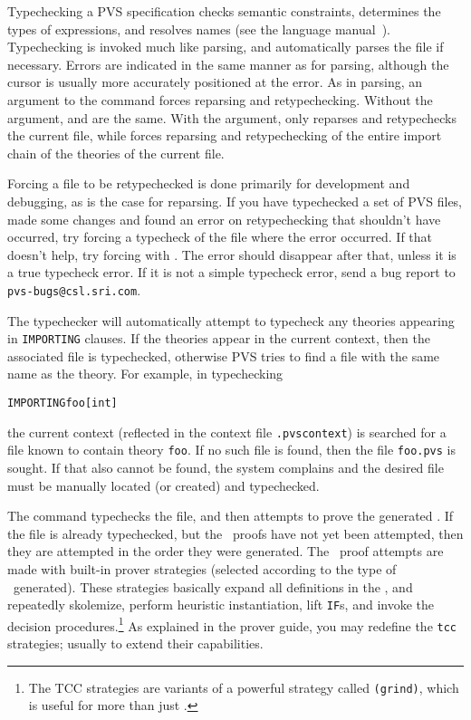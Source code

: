 Typechecking a PVS specification checks semantic constraints, determines
the types of expressions, and resolves names (see the language
manual~\cite{PVS:language}).  Typechecking is invoked
much like parsing, and automatically parses the file if necessary.  Errors
are indicated in the same manner as for parsing, although the cursor is
usually more accurately positioned at the error.  As in parsing, an
argument to the command forces reparsing and retypechecking.  Without the
argument,  and  are the same.
With the argument,  only reparses and retypechecks the
current file, while  forces reparsing and
retypechecking of the entire import chain of the theories of the current
file.

Forcing a file to be retypechecked is done primarily for development and
debugging, as is the case for reparsing.  If you have typechecked a set of
PVS files, made some changes and found an error on retypechecking that
shouldn't have occurred, try forcing a typecheck of the file where the
error occurred.  If that doesn't help, try forcing with
.  The error should disappear after that,
unless it is a true typecheck error.  If it is not a simple typecheck
error, send a bug report to \texttt{pvs-bugs@csl.sri.com}.

The typechecker will automatically attempt to typecheck any theories
appearing in \texttt{IMPORTING} clauses.  If the theories appear in the
current context, then the associated file is typechecked, otherwise
PVS tries to find a file with the same name as the theory.  For
example, in typechecking
\begin{alltt}
  IMPORTING foo[int]
\end{alltt}
the current context (reflected in the context file \texttt{.pvscontext}) is
searched for a file known to contain theory \texttt{foo}.  If no such file is
found, then the file \texttt{foo.pvs} is sought.  If that also cannot be
found, the system complains and the desired file must be manually
located (or created) and typechecked.

The  command typechecks the file, and then attempts
to prove the generated \tccs.  If the file is already typechecked, but the
\tcc\ proofs have not yet been attempted, then they are attempted in the
order they were generated.  The \tcc\ proof attempts are made with 
built-in prover strategies (selected according to the type of \tcc\
generated). These strategies basically expand all
definitions in the \tcc, and repeatedly skolemize, perform heuristic
instantiation, lift \texttt{IF}s, and invoke the decision
procedures.\footnote{The TCC strategies are variants of a powerful
strategy called \texttt{(grind)}, which is useful for more
than just \tccs.} As explained in the prover guide, you may redefine the
\texttt{tcc} strategies; usually to extend their capabilities.

